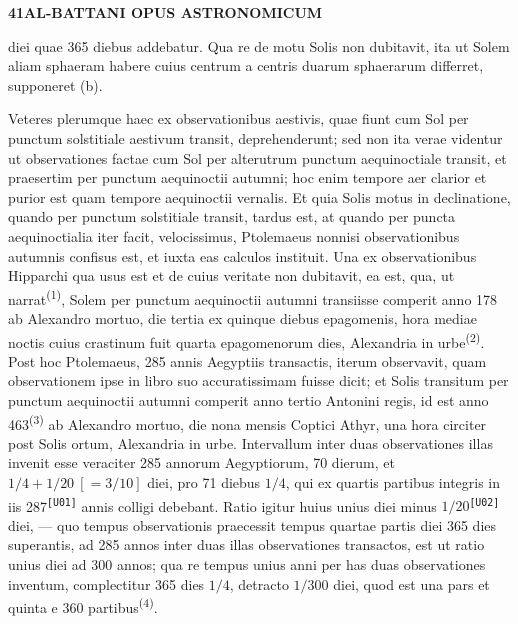 \documentclass[10pt,a4paper]{article}
\newcommand{\SP}[3]{%
  \clearpage
  \hypertarget{AB01-PDF#1}{}%
  \begin{center}
    \textbf{#2\quad #3}
  \end{center}%
}
\newcommand{\A}[1]{\hypertarget{#1}{}}
\newcommand{\NM}[1]{\textsuperscript{(#1)}}
\newcommand{\U}[2]{%
  #2\textsuperscript{\texttt{[#1]}}%
}
\begin{document}

\SP{0130}{41}{AL-BATTANI OPUS ASTRONOMICUM}

\A{AB01-PDF0130-P01}
diei quae 365 diebus addebatur. Qua re de motu Solis non dubitavit,
ita ut Solem aliam sphaeram habere cuius centrum a centris duarum
sphaerarum differret, supponeret (b).

\A{AB01-PDF0130-P02}
Veteres plerumque haec ex observationibus aestivis, quae fiunt cum
Sol per punctum solstitiale aestivum transit, deprehenderunt; sed
non ita verae videntur ut observationes factae cum Sol per
alterutrum punctum aequinoctiale transit, et praesertim per punctum
aequinoctii autumni; hoc enim tempore aer clarior et purior est quam
tempore aequinoctii vernalis. Et quia Solis motus in declinatione,
quando per punctum solstitiale transit, tardus est, at quando per
puncta aequinoctialia iter facit, velocissimus, Ptolemaeus nonnisi
observationibus autumnis confisus est, et iuxta eas calculos
instituit. Una ex observationibus Hipparchi qua usus est et de
cuius veritate non dubitavit, ea est, qua, ut narrat\NM{1}, Solem
per punctum aequinoctii autumni transiisse comperit anno 178 ab
Alexandro mortuo, die tertia ex quinque diebus epagomenis, hora
mediae noctis cuius crastinum fuit quarta epagomenorum dies,
Alexandria in urbe\NM{2}. Post hoc Ptolemaeus, 285 annis Aegyptiis
transactis, iterum observavit, quam observationem ipse in libro suo
accuratissimam fuisse dicit; et Solis transitum per punctum
aequinoctii autumni comperit anno tertio Antonini regis, id est
anno 463\NM{3} ab Alexandro mortuo, die nona mensis Coptici Athyr,
una hora circiter post Solis ortum, Alexandria in urbe. Intervallum
inter duas observationes illas invenit esse veraciter 285 annorum
Aegyptiorum, 70 dierum, et $1/4+1/20\ [=3/10]$ diei, pro 71 diebus
$1/4$, qui ex quartis partibus integris in iis \U{U01}{287} annis
colligi debebant. Ratio igitur huius unius diei minus
\U{U02}{$1/20$} diei, --- quo tempus observationis praecessit tempus
quartae partis diei 365 dies superantis, ad 285 annos inter duas
illas observationes transactos, est ut ratio unius diei ad 300
annos; qua re tempus unius anni per has duas observationes
inventum, complectitur 365 dies $1/4$, detracto $1/300$ diei, quod
est una pars et quinta e 360 partibus\NM{4}.
\end{document}
